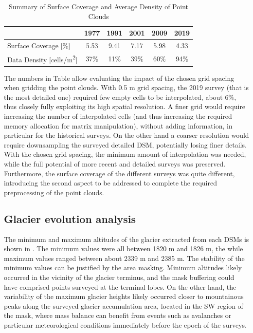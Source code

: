 {\begin{table}[ht]
  \centering
  \caption{Summary of Surface Coverage and Average Density of Point Clouds}
  \label{tab:2:pcd_surface_coverage}
  \begin{tabular}{lccccc}
    \hline
    & 1977 & 1991 & 2001 & 2009 & 2019 \\
    \hline
    Surface Coverage [\%] & 5.53 & 9.41 & 7.17 & 5.98 & 4.33 \\
    Data Density [cells/m\textsuperscript{2}] & 37\% & 11\% & 39\% & 60\% & 94\% \\
    \hline
  \end{tabular}
\end{table}

The numbers in Table  allow evaluating the impact of the chosen grid spacing when gridding the point clouds. 
With 0.5 m grid spacing, the 2019 survey (that is the most detailed one) required few empty cells to be interpolated, about 6\%, thus closely fully exploiting its high spatial resolution. 
A finer grid would require increasing the number of interpolated cells (and thus increasing the required memory allocation for matrix manipulation), without adding information, in particular for the historical surveys.
On the other hand a coarser resolution would require downsampling the surveyed detailed DSM, potentially losing finer details. 
With the chosen grid spacing, the minimum amount of interpolation was needed, while the full potential of more recent and detailed surveys was preserved. 
Furthermore, the surface coverage of the different surveys was quite different, introducing the second aspect to be addressed to complete the required preprocessing of the point clouds.

\subsection{Glacier evolution analysis}{\label{sec:2:res_glacier_evolution}

The minimum and maximum altitudes of the glacier extracted from each DSMs is shown in .
The minimum values were all between 1820 m and 1826 m, the while maximum values ranged between about 2339 m and 2385 m. 
The stability of the minimum values can be justified by the area masking. 
Minimum altitudes likely occurred in the vicinity of the glacier terminus, and the mask buffering could have comprised points surveyed at the terminal lobes.
On the other hand, the variability of the maximum glacier heights likely occurred closer to mountainous peaks along the surveyed glacier accumulation area, located in the SW region of the mask, where mass balance can benefit from events such as avalanches or particular meteorological conditions immediately before the epoch of the surveys.

}}
